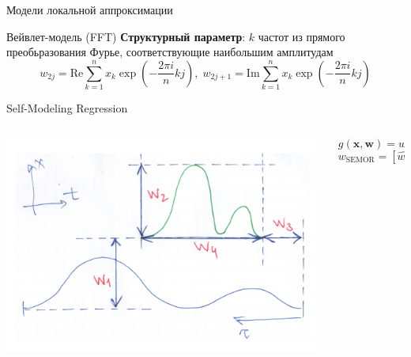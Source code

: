 \documentclass{beamer}
\newcommand{\bx}{\mathbf{x}}
\newcommand{\bw}{\mathbf{w}}
\newcommand{\brs}[1]{\left(#1\right)}
\begin{document}
\begin{frame}{Модели локальной аппроксимации}
    \begin{block}{Вейвлет-модель (FFT)}
        \textbf{Структурный параметр}: $k$ частот из прямого преобьразования Фурье,
        соответствующие наибольшим амплитудам
        $$
    w_{2j} = \mathrm{Re} \sum_{k=1}^{n} x_k \exp\brs{-\frac{2\pi i}{n}kj}, \; w_{2j + 1} = \mathrm{Im} \sum_{k=1}^{n} x_k \exp\brs{-\frac{2\pi i}{n}kj}
        $$
    \end{block}
    \begin{block}{Self-Modeling Regression}
        \begin{columns}
            \begin{column}{.44\textwidth}
                \begin{center}
                    \includegraphics[scale=0.18]{../pics/semor_illustration.png}
                \end{center}
            \end{column}
            \begin{column}{.56\textwidth}
                $$
                g(\bx, \bw) = w_1 + w_2 p(w_3 + w_4t),
                $$
                $$
                w_{\text{SEMOR}} = [\hat{w_1}, \hat{w_2}, \hat{w_3}, \hat{w_4}, \rho].
                $$
            \end{column}
        \end{columns}
    \end{block}
\end{frame}
\end{document}
